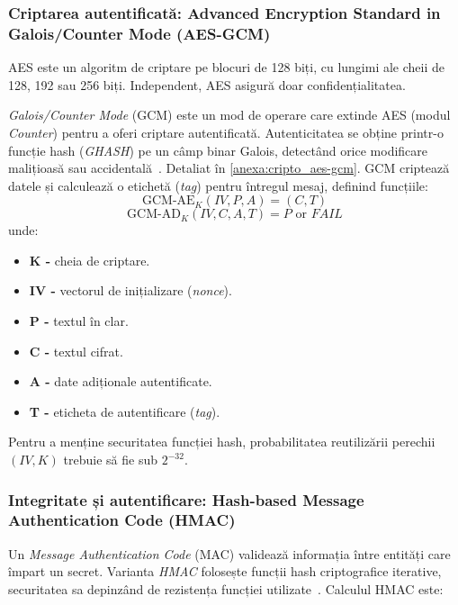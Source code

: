 \subsubsection[Criptarea autentificată (AES-GCM)]{Criptarea autentificată: Advanced Encryption Standard in Galois/Counter Mode (AES-GCM)}
AES este un algoritm de criptare pe blocuri de 128 biți, cu lungimi ale cheii de 128, 192 sau 256 biți. Independent, AES asigură doar confidențialitatea.

\textit{Galois/Counter Mode} (GCM) este un mod de operare care extinde AES (modul \textit{Counter}) pentru a oferi criptare autentificată. Autenticitatea se obține printr-o funcție hash (\textit{GHASH}) pe un câmp binar Galois, detectând orice modificare malițioasă sau accidentală~\cite{nist_aesgcm}. Detaliat în \ref{anexa:cripto_aes-gcm}. GCM criptează datele și calculează o etichetă (\textit{tag}) pentru întregul mesaj, definind funcțiile:
$$ \text{GCM-AE}_K( IV, P, A ) = ( C, T ) $$
$$ \text{GCM-AD}_K( IV, C, A, T ) = P \text{ or } \mathit{FAIL} $$
unde:
\begin{itemize}
    \setlength{\itemsep}{0pt}
    \setlength{\parskip}{0pt}
    \item \textbf{K -} cheia de criptare.
    \item \textbf{IV -} vectorul de inițializare (\textit{nonce}).
    \item \textbf{P -} textul în clar.
    \item \textbf{C -} textul cifrat.
    \item \textbf{A -} date adiționale autentificate.
    \item \textbf{T -} eticheta de autentificare (\textit{tag}).
\end{itemize}

Pentru a menține securitatea funcției hash, probabilitatea reutilizării perechii $(IV, K)$ trebuie să fie sub $2^{-32}$.

\subsubsection[Integritate și autentificare (HMAC)]{Integritate și autentificare: Hash-based Message Authentication Code (HMAC)}
Un \textit{Message Authentication Code} (MAC) validează informația între entități care împart un secret. Varianta \textit{HMAC} folosește funcții hash criptografice iterative, securitatea sa depinzând de rezistența funcției utilizate~\cite{rfc2104}. Calculul HMAC este:

